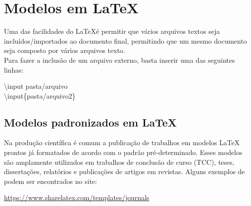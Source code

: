 \section{Modelos em \LaTeX}

\begin{frame}
    Uma das facilidades do \LaTeX é  permitir que vários arquivos textos seja incluídos/importados ao documento final, permitindo que um mesmo documento seja composto por vários arquivos texto.\\
    Para fazer a inclusão de um arquivo externo, basta inserir uma das seguintes linhas:

\vspace{1cm}
\begin{center}
    {\ttfamily \textbackslash input {pasta/arquivo}}\\
    {\ttfamily \textbackslash input\{pasta/arquivo2\}}
\end{center}

\end{frame}


\begin{frame}
\subsection*{Modelos padronizados em \LaTeX} %

Na produção científica é comum a publicação de trabalhos em modelos \LaTeX~ prontos já formatados de acordo com o padrão pré-determinado. Esses modelos são amplamente utilizados em trabalhos de conclusão de curso (TCC), teses, dissertações, relatórios e publicações de artigos em revistas. Alguns exemplos de podem ser encontrados no site:

\begin{center}
\url{https://www.sharelatex.com/templates/journals}
\end{center}
\end{frame}


